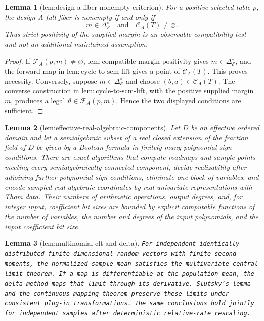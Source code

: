 \documentclass{article}
\newtheorem{lemma}{Lemma}
\begin{document}
\begin{lemma}[lem:design-a-fiber-nonempty-criterion]\label{lem:design-a-fiber-nonempty-criterion}
For a positive selected table \(p\), the design-A full fiber is nonempty if and only if
\[
m\in\Delta_{\mathcal E}^{\circ}
\quad\text{and}\quad
\mathcal C_A(T)\ne\varnothing.
\]
Thus strict positivity of the supplied margin is an observable compatibility test and not an additional maintained assumption.
\end{lemma}
\begin{proof}
If \(\mathcal F_A(p,m)\ne\varnothing\), \(\mathrm{lem:compatible\text{-}margin\text{-}positivity}\) gives \(m\in\Delta_{\mathcal E}^{\circ}\), and the forward map in \(\mathrm{lem:cycle\text{-}to\text{-}scm\text{-}lift}\) gives a point of \(\mathcal C_A(T)\).  This proves necessity.  Conversely, suppose \(m\in\Delta_{\mathcal E}^{\circ}\) and choose \((b,a)\in\mathcal C_A(T)\).  The converse construction in \(\mathrm{lem:cycle\text{-}to\text{-}scm\text{-}lift}\), with the positive supplied margin \(m\), produces a legal \(\vartheta\in\mathcal F_A(p,m)\).  Hence the two displayed conditions are sufficient.
\end{proof}

\begin{lemma}[lem:effective-real-algebraic-components]\label{lem:effective-real-algebraic-components}
Let \(D\) be an effective ordered domain and let a semialgebraic subset of a real closed extension of the fraction field of \(D\) be given by a Boolean formula in finitely many polynomial sign conditions.  There are exact algorithms that compute roadmaps and sample points meeting every semialgebraically connected component, decide realizability after adjoining further polynomial sign conditions, eliminate one block of variables, and encode sampled real algebraic coordinates by real-univariate representations with Thom data.  Their numbers of arithmetic operations, output degrees, and, for integer input, coefficient bit sizes are bounded by explicit computable functions of the number of variables, the number and degrees of the input polynomials, and the input coefficient bit size.
\end{lemma}

\begin{lemma}[lem:multinomial-clt-and-delta]\label{lem:multinomial-clt-and-delta}
\texttt{For independent identically distributed finite-\allowbreak{}dimensional random vectors with finite second moments,\allowbreak{} the normalized sample mean satisfies the multivariate central limit theorem.  If a map is differentiable at the population mean,\allowbreak{} the delta method maps that limit through its derivative.  Slutsky's lemma and the continuous-\allowbreak{}mapping theorem preserve these limits under consistent plug-\allowbreak{}in transformations.  The same conclusions hold jointly for independent samples after deterministic relative-\allowbreak{}rate rescaling.}
\end{lemma}
\end{document}
